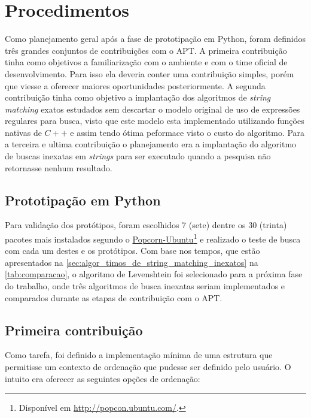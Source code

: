 \section{Procedimentos} %
\label{sec:planejamento_de_contribui_es}

Como planejamento geral após a fase de prototipação em Python, foram definidos três grandes conjuntos de contribuições com o {\code APT}. A primeira contribuição tinha como objetivos a familiarização com o ambiente e com o time oficial de desenvolvimento. Para isso ela deveria conter uma contribuição simples, porém que viesse a oferecer maiores oportunidades posteriormente. A segunda contribuição tinha como objetivo a implantação dos algoritmos de \textit{string matching} exatos estudados sem descartar o modelo original de uso de expressões regulares para busca, visto que este modelo esta implementado utilizando funções nativas de $C++$ e assim tendo ótima peformace visto o custo do algoritmo. Para a terceira e ultima contribuição o planejamento era a implantação do algoritmo de buscas inexatas em \textit{strings} para ser executado quando a pesquisa não retornasse nenhum resultado.


\subsection{Prototipação em Python}

Para validação dos protótipos, foram escolhidos 7 (sete) dentre os 30 (trinta) pacotes mais instalados segundo o \href{http://popcon.ubuntu.com/}{Popcorn-Ubuntu}\footnote{Disponível em \url{http://popcon.ubuntu.com/}.} e realizado o teste de busca com cada um destes e os protótipos. Com base nos tempos, que estão apresentados na \autoref{sec:algor_timos_de_string_matching_inexatos} na \autoref{tab:comparacao}, o algoritmo de Levenshtein foi selecionado para a próxima fase do trabalho, onde três algoritmos de busca inexatas seriam implementados e comparados durante as etapas de contribuição com o APT.

\subsection{Primeira contribuição} %
\label{sec:primeira_contribui_o}

Como tarefa, foi definido a implementação mínima de uma estrutura que permitisse um contexto de ordenação que pudesse ser definido pelo usuário. O intuito era oferecer as seguintes opções de ordenação:

